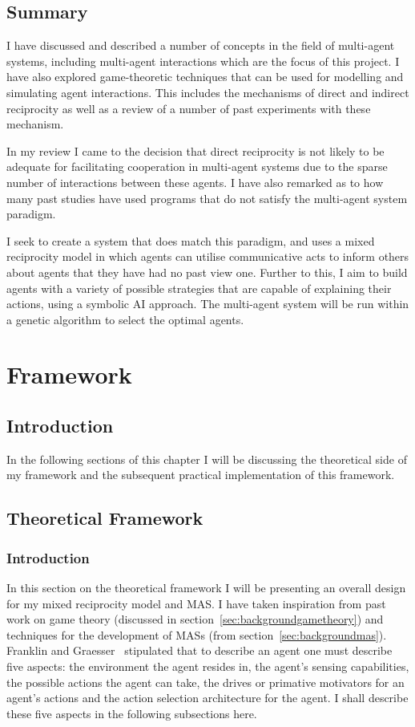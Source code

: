 \documentclass[]{final_report}
\begin{document}
\section{Summary}
I have discussed and described a number of concepts in the field of multi-agent systems, including multi-agent interactions which are the focus of this project. I have also explored game-theoretic techniques that can be used for modelling and simulating agent interactions. This includes the mechanisms of direct and indirect reciprocity as well as a review of a number of past experiments with these mechanism.\par 
In my review I came to the decision that direct reciprocity is not likely to be adequate for facilitating cooperation in multi-agent systems due to the sparse number of interactions between these agents. I have also remarked as to how many past studies have used programs that do not satisfy the multi-agent system paradigm.\par 
I seek to create a system that does match this paradigm, and uses a mixed reciprocity model in which agents can utilise communicative acts to inform others about agents that they have had no past view one. Further to this, I aim to build agents with a variety of possible strategies that are capable of explaining their actions, using a symbolic AI approach. The multi-agent system will be run within a genetic algorithm to select the optimal agents.

\chapter{Framework}

\section{Introduction}
In the following sections of this chapter I will be discussing the theoretical side of my framework and the subsequent practical implementation of this framework.

\section{Theoretical Framework}
\label{sec:theo}

\subsection{Introduction}
In this section on the theoretical framework I will be presenting an overall design for my mixed reciprocity model and MAS. I have taken inspiration from past work on game theory (discussed in section~\ref{sec:backgroundgametheory}) and techniques for the development of MASs (from section~\ref{sec:backgroundmas}). Franklin and Graesser~\cite{franklin1996agent} stipulated that to describe an agent one must describe five aspects: the environment the agent resides in, the agent's sensing capabilities, the possible actions the agent can take, the drives or primative motivators for an agent's actions and the action selection architecture for the agent. I shall describe these five aspects in the following subsections here.
\end{document}
